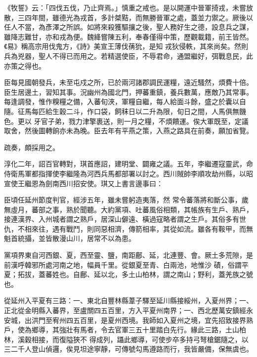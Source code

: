 \begin{pinyinscope}
 《牧誓》云：「四伐五伐，乃止齊焉。」慎重之戒也。是以開運中晉軍掎戎，未嘗放散，三四年間，雖德光為戎首，多計桀黠，而無勝晉軍之處，蓋並力禦之。厥後以任人不當，為彥澤之所誤。如將來殺獲驅攘之後，聖人務好生之德，設息兵之謀，雖降志難甘，亦和戎為便。魏絳嘗陳五利，奉春僅得中策，歷觀載籍，前王皆然。《易》稱高宗用伐鬼方，《詩》美宣王薄伐蒨狁，是知
 戎狄侵軼，其來尚矣。然則兵為兇器，聖人不得已而用之。若精選使臣，不辱君命，通盟繼好，弭戰息民，此亦策之得也。



 臣每見國朝發兵，未至屯戍之所，已於兩河諸郡調民運糧，遠近騷然，煩費十倍。臣生居邊土，習知其事。況幽州為國北門，押蕃重鎮，養兵數萬，應敵乃其常事。每逢調發，惟作糗糧之備，入蕃旬浹，軍糧自繼，每人給面斗餘，盛之於囊以自隨。征馬每匹給生穀二斗，作口袋，飼秣日以二升為限，旬日之間，人馬俱無饑色。更以
 牙官子弟，戮力津擎裹送，則一月之糧，不煩饋運。俟大軍既至，定議取舍，然後圖轉餉亦未為晚。臣去年有平燕之策，入燕之路具在前奏，願加省覽。



 疏奏，頗採用之。



 淳化二年，詔百官轉對，琪首應詔，建明堂、闢雍之議。五年，李繼遷寇靈武，命侍衛馬軍都指揮使李繼隆為河西兵馬都部署以討之。西川賊帥李順攻劫州縣，以昭宣使王繼恩為劍南西川招安使。琪又上書言邊事曰：



 臣頃任延州節度判官，經涉五年，雖未嘗躬造夷落，然
 常令蕃落將和斷公事，歲無虛月，蕃部之事，熟於聞聽。大約黨項、吐蕃風俗相類，其帳族有生戶、熟戶，接連漢界、入州城者謂之熟戶，居深山僻遠、橫過寇略者謂之生戶。其俗多有世仇，不相來往，遇有戰鬥，則同惡相濟，傳箭相率，其從如流。雖各有鞍甲，而無魁首統攝，並皆散漫山川，居常不以為患。



 黨項界東自河西銀、夏，西至靈、鹽，南距鄜、延，北連豐、會。厥土多荒隙，是前漢呼韓邪所處河南之地，幅員千里。從銀夏至青、白兩池，地惟沙
 磧，俗謂平夏；拓拔，蓋蕃姓也。自鄜、延以北，多土山柏林，謂之南山；野利，蓋羌族之號也。



 從延州入平夏有三路：一、東北自豐林縣葦子驛至延川縣接綏州，入夏州界；一、正北從金明縣入蕃界，至盧關四五百里，方入平夏州南界；一、西北歷萬安鎮經永安城，出洪門至宥州四五百里，是夏州西境。我師如入夏州之境，宜先招致接界熟戶，使為鄉導，其強壯有馬者，令去官軍三五十里踏白先行。緣此三路，土山柏林，溪穀相接，而復隘狹不
 得成列，躡此鄉導，可使步卒多持弓弩槍鋸隨之，以三二千人登山偵邏，俟見坦途寧靜，可傳號勾馬遵路而行，我皆嚴備，保無虞也。




\end{pinyinscope}
